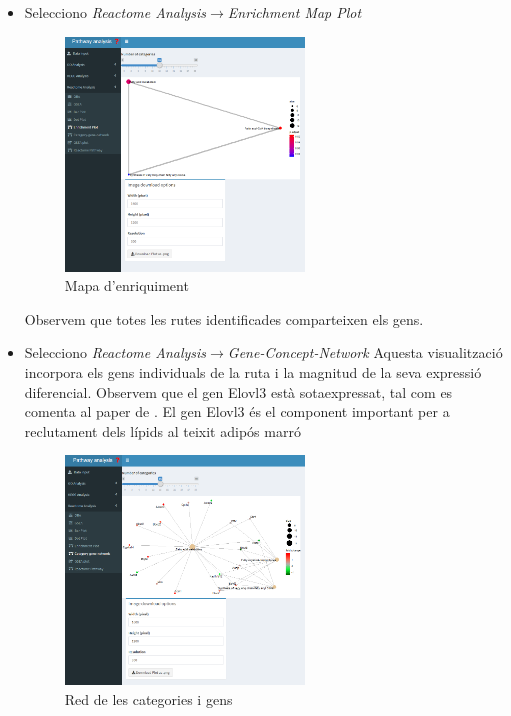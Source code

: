 \begin{enumerate}
\begin{itemize}
\item Selecciono \textit{Reactome Analysis}$\rightarrow$\textit{\gls{Enrichment Map} Plot}

\begin{figure}[H]
\centering
\includegraphics[width=0.6\textwidth]{figures/Estudi1_Fig6_ORA_EP_RA.png} 
\caption{Mapa d’enriquiment}
\end{figure}

Observem que totes les rutes identificades comparteixen els gens.

\item Selecciono \textit{Reactome Analysis}$\rightarrow$\textit{\gls{Gene-Concept-Network}}
Aquesta visualització incorpora els gens individuals de la ruta i la magnitud de la seva expressió diferencial. Observem que el gen Elovl3 està sotaexpressat, tal com es comenta al paper de \cite{li2017zbtb7b}. El gen Elovl3 és el component important per a reclutament dels lípids al teixit adipós marró \cite{westerberg2006elovl3}

\begin{figure}[H]
\centering
\includegraphics[width=0.6\textwidth]{figures/Estudi1_Fig7_ORA_CP_RA.png} 
\caption{Red de les categories i gens}
\end{figure}


\end{itemize}
\end{enumerate}
